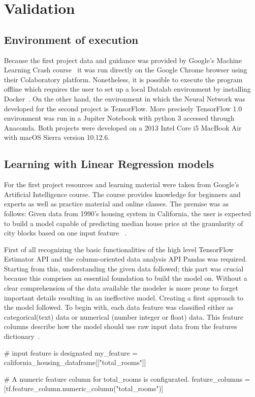 

\section{Validation}
\label{sec:validation}



\subsection{Environment of execution}
Because the first project data and guidance was provided by Google's Machine Learning Crash course~\cite{mlchrome18}  it was run directly on the Google Chrome browser using their Colaboratory platform. Nonetheless, it is possible to execute the program offline which requires the user to set up a local Datalab environment by installing Docker~\cite{docker18}.   
On the other hand, the environment in which the Neural Network was developed for the second  project is TensorFlow. More precisely TensorFlow 1.0 environment was run in a Jupiter Notebook with python 3 accessed through Anaconda. 
Both projects were developed on a 2013 Intel Core i5 MacBook Air with macOS Sierra version 10.12.6.

\subsection{Learning with Linear Regression models}

For the first project resources and learning material were taken from Google’s Artificial Intelligence course.  The course provides knowledge for beginners and experts as well as practice material and online classes. The premise was as follows: Given data from 1990’s housing system in California, the user is expected to build a model capable of predicting median house price at the granularity of city blocks based on one input feature  ~\cite{mlchrome18}. 

First of all recognizing the basic functionalities of the  high level TensorFlow Estimator API and the column-oriented data analysis API Pandas was required. Starting from this, understanding the given data followed; this part was crucial because this comprises an essential foundation to build the model on. Without a clear comprehension of the data available the modeler is more prone to forget important details resulting in an ineffective model.  
Creating a first approach to the model followed. To begin with, each data feature was classified either as categorical(text) data or numerical (number integer or float) data. This feature columns describe 
how the model should use raw input data from the features dictionary~\cite{tensor18}.
\begin{tensorflow}[caption={ads}]
# input feature is designated
my_feature = california_housing_dataframe[["total_rooms"]]

# A numeric feature column for total_rooms is configurated.
feature_columns = [tf.feature_column.numeric_column("total_rooms")]
\end{tensorflow}

